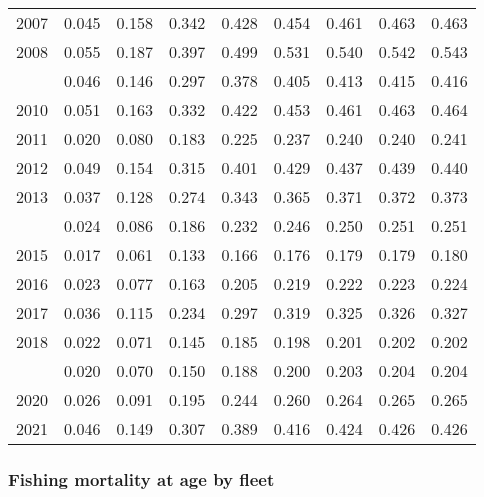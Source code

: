 \documentclass[
]{article}
\begin{document}
\begin{longtable}[t]{lrrrrrrrr}
2007 & 0.045 & 0.158 & 0.342 & 0.428 & 0.454 & 0.461 & 0.463 & 0.463\\
2008 & 0.055 & 0.187 & 0.397 & 0.499 & 0.531 & 0.540 & 0.542 & 0.543\\
\addlinespace
2009 & 0.046 & 0.146 & 0.297 & 0.378 & 0.405 & 0.413 & 0.415 & 0.416\\
2010 & 0.051 & 0.163 & 0.332 & 0.422 & 0.453 & 0.461 & 0.463 & 0.464\\
2011 & 0.020 & 0.080 & 0.183 & 0.225 & 0.237 & 0.240 & 0.240 & 0.241\\
2012 & 0.049 & 0.154 & 0.315 & 0.401 & 0.429 & 0.437 & 0.439 & 0.440\\
2013 & 0.037 & 0.128 & 0.274 & 0.343 & 0.365 & 0.371 & 0.372 & 0.373\\
\addlinespace
2014 & 0.024 & 0.086 & 0.186 & 0.232 & 0.246 & 0.250 & 0.251 & 0.251\\
2015 & 0.017 & 0.061 & 0.133 & 0.166 & 0.176 & 0.179 & 0.179 & 0.180\\
2016 & 0.023 & 0.077 & 0.163 & 0.205 & 0.219 & 0.222 & 0.223 & 0.224\\
2017 & 0.036 & 0.115 & 0.234 & 0.297 & 0.319 & 0.325 & 0.326 & 0.327\\
2018 & 0.022 & 0.071 & 0.145 & 0.185 & 0.198 & 0.201 & 0.202 & 0.202\\
\addlinespace
2019 & 0.020 & 0.070 & 0.150 & 0.188 & 0.200 & 0.203 & 0.204 & 0.204\\
2020 & 0.026 & 0.091 & 0.195 & 0.244 & 0.260 & 0.264 & 0.265 & 0.265\\
2021 & 0.046 & 0.149 & 0.307 & 0.389 & 0.416 & 0.424 & 0.426 & 0.426\\*
\end{longtable}

\hypertarget{fishing-mortality-at-age-by-fleet}{%
\subsubsection{Fishing mortality at age by
fleet}\label{fishing-mortality-at-age-by-fleet}}
\end{document}
